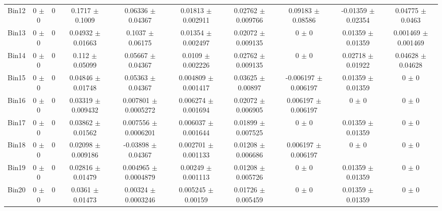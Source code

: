 \begin{tabular}{@{\extracolsep{4pt}}lccccccccc@{}}
     Bin12 & 0 $\pm$ 0 & 0 & 0.1717 $\pm$ 0.1009 & 0.06336 $\pm$ 0.04367 & 0.01813 $\pm$ 0.002911 & 0.02762 $\pm$ 0.009766 & 0.09183 $\pm$ 0.08586 & -0.01359 $\pm$ 0.02354 & 0.04775 $\pm$ 0.0463 \\ 
     Bin13 & 0 $\pm$ 0 & 0 & 0.04932 $\pm$ 0.01663 & 0.1037 $\pm$ 0.06175 & 0.01354 $\pm$ 0.002497 & 0.02072 $\pm$ 0.009135 & 0 $\pm$ 0 & 0.01359 $\pm$ 0.01359 & 0.001469 $\pm$ 0.001469 \\ 
     Bin14 & 0 $\pm$ 0 & 0 & 0.112 $\pm$ 0.05099 & 0.05667 $\pm$ 0.04367 & 0.0109 $\pm$ 0.002226 & 0.02762 $\pm$ 0.009135 & 0 $\pm$ 0 & 0.02718 $\pm$ 0.01922 & 0.04628 $\pm$ 0.04628 \\ 
     Bin15 & 0 $\pm$ 0 & 0 & 0.04846 $\pm$ 0.01748 & 0.05363 $\pm$ 0.04367 & 0.004809 $\pm$ 0.001417 & 0.03625 $\pm$ 0.00897 & -0.006197 $\pm$ 0.006197 & 0.01359 $\pm$ 0.01359 & 0 $\pm$ 0 \\ 
     Bin16 & 0 $\pm$ 0 & 0 & 0.03319 $\pm$ 0.009432 & 0.007801 $\pm$ 0.0005272 & 0.006274 $\pm$ 0.001694 & 0.02072 $\pm$ 0.006905 & 0.006197 $\pm$ 0.006197 & 0 $\pm$ 0 & 0 $\pm$ 0 \\ 
     Bin17 & 0 $\pm$ 0 & 0 & 0.03862 $\pm$ 0.01562 & 0.007556 $\pm$ 0.0006201 & 0.006037 $\pm$ 0.001644 & 0.01899 $\pm$ 0.007525 & 0 $\pm$ 0 & 0.01359 $\pm$ 0.01359 & 0 $\pm$ 0 \\ 
     Bin18 & 0 $\pm$ 0 & 0 & 0.02098 $\pm$ 0.009186 & -0.03898 $\pm$ 0.04367 & 0.002701 $\pm$ 0.001133 & 0.01208 $\pm$ 0.006686 & 0.006197 $\pm$ 0.006197 & 0 $\pm$ 0 & 0 $\pm$ 0 \\ 
     Bin19 & 0 $\pm$ 0 & 0 & 0.02816 $\pm$ 0.01479 & 0.004965 $\pm$ 0.0004879 & 0.00249 $\pm$ 0.001113 & 0.01208 $\pm$ 0.005726 & 0 $\pm$ 0 & 0.01359 $\pm$ 0.01359 & 0 $\pm$ 0 \\ 
     Bin20 & 0 $\pm$ 0 & 0 & 0.0361 $\pm$ 0.01473 & 0.00324 $\pm$ 0.0003246 & 0.005245 $\pm$ 0.00159 & 0.01726 $\pm$ 0.005459 & 0 $\pm$ 0 & 0.01359 $\pm$ 0.01359 & 0 $\pm$ 0 \\ 
\hline\hline
  \end{tabular}
